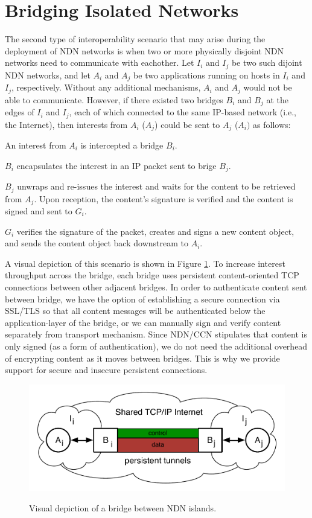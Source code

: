 \section{Bridging Isolated Networks} \label{sec:bridge}
The second type of interoperability scenario that may arise during the deployment of NDN networks is when two or more physically disjoint NDN networks need to communicate with eachother. Let $I_i$ and $I_j$ be two such dijoint NDN networks, and let $A_i$ and $A_j$ be two applications running on hosts in $I_i$ and $I_j$, respectively. Without any additional mechanisms, $A_i$ and $A_j$ would not be able to communicate. However, if there existed two bridges $B_i$ and $B_j$ at the edges of $I_i$ and $I_j$, each of which connected to the same IP-based network (i.e., the Internet), then interests from $A_i$ ($A_j$) could be sent to $A_j$ ($A_i)$ as follows:
\begin{compactenum} 
	\item An interest from $A_i$ is intercepted a bridge $B_i$.
	\item $B_i$ encapsulates the interest in an IP packet sent to brige $B_j$.
	\item $B_j$ unwraps and re-issues the interest and waits for the content to be retrieved from $A_j$. Upon reception, the content's signature is verified and the content is signed and sent to $G_i$. 
	\item $G_i$ verifies the signature of the packet, creates and signs a new content object, and sends the content object back downstream to $A_i$.
\end{compactenum}
A visual depiction of this scenario is shown in Figure \ref{fig:islands}. To increase interest throughput across the bridge, each bridge uses persistent content-oriented TCP connections between other adjacent bridges. In order to authenticate content sent between bridge, we have the option of establishing a secure connection via SSL/TLS so that all content messages will be authenticated below the application-layer of the bridge, or we can manually sign and verify content separately from transport mechanism. Since NDN/CCN stipulates that content is only signed (as a form of authentication), we do not need the additional overhead of encrypting content as it moves between bridges. This is why we provide support for secure and insecure persistent connections. 

\begin{figure}[ht!]
\begin{center}
\includegraphics[scale=0.45]{./images/island_tunnel.pdf}
\label{fig:islands}
\caption{Visual depiction of a bridge between NDN islands.}
\end{center}
\end{figure}

